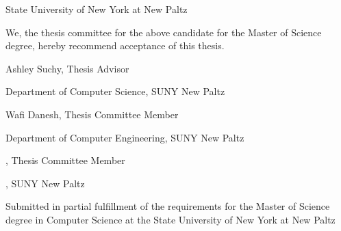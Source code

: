 \begin{center}
  \thispagestyle{empty}
  \vspace*{0.6in}
  {\large \MakeUppercase{\thesistitle}\par}
  \vspace{2.5\baselineskip}
  \thesisauthor\par
  \vspace{2\baselineskip}
  State University of New York at New Paltz\par
  \vspace{2\baselineskip}
  We, the thesis committee for the above candidate for the Master of Science degree, hereby
  recommend acceptance of this thesis.\par
  \vspace{3\baselineskip}
  Ashley Suchy, Thesis Advisor\par
  Department of Computer Science, SUNY New Paltz\par
  \vspace{2.5\baselineskip}
  Wafi Danesh, Thesis Committee Member\par
  Department of Computer Engineering, SUNY New Paltz\par
  \vspace{2.5\baselineskip}
  \fixnote{[Name]}, Thesis Committee Member\par
  \fixnote{[Department]}, SUNY New Paltz\par
  \vfill
  Submitted in partial fulfillment of the requirements for the Master of Science degree in
  Computer Science at the State University of New York at New Paltz\par
  \vspace*{0.4in}
\end{center}
\clearpage
\addtocounter{page}{-1}







\begingroup
{}
\tableofcontents
\listoffigures
\listoftables
\clearpage
\endgroup




